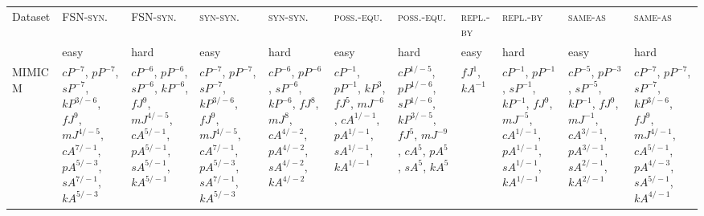 \documentclass[letterpaper]{article} %
\newcommand{\dataset}[1]{\textsc{#1}}
\begin{document}
\begin{sidewaystable*}
    \centering
    \small
    \begin{tabular}{l l l l l l l l l l l }
    \toprule
         Dataset & \dataset{FSN-syn.} & \dataset{FSN-syn.} & \dataset{syn-syn.} & \dataset{syn-syn.}& \dataset{poss.-equ.} & \dataset{poss.-equ.} & \dataset{repl.-by} & \dataset{repl.-by} & \dataset{same-as} & \dataset{same-as} \\
& easy & hard & easy & hard& easy & hard & easy & hard & easy & hard \\ 
         \midrule
\multirow{10}{1.7cm}{MIMIC M} & \multirow{10}{1.7cm}{$cP^{-7}$, $pP^{-7}$, $sP^{-7}$, $kP^{3/-6}$, $fJ^{9}$, $mJ^{4/-5}$, $cA^{7/-1}$, $pA^{5/-3}$, $sA^{7/-1}$, $kA^{5/-3}$} & \multirow{10}{1.7cm}{$cP^{-6}$, $pP^{-6}$, $sP^{-6}$, $kP^{-6}$, $fJ^{9}$, $mJ^{4/-5}$, $cA^{5/-1}$, $pA^{5/-1}$, $sA^{5/-1}$, $kA^{5/-1}$} & \multirow{10}{1.7cm}{$cP^{-7}$, $pP^{-7}$, $sP^{-7}$, $kP^{3/-6}$, $fJ^{9}$, $mJ^{4/-5}$, $cA^{7/-1}$, $pA^{5/-3}$, $sA^{7/-1}$, $kA^{5/-3}$} & \multirow{10}{1.7cm}{$cP^{-6}$, $pP^{-6}$, $sP^{-6}$, $kP^{-6}$, $fJ^{8}$, $mJ^{8}$, $cA^{4/-2}$, $pA^{4/-2}$, $sA^{4/-2}$, $kA^{4/-2}$} & \multirow{10}{1.7cm}{$cP^{-1}$, $pP^{-1}$, $kP^{3}$, $fJ^{5}$, $mJ^{-6}$, $cA^{1/-1}$, $pA^{1/-1}$, $sA^{1/-1}$, $kA^{1/-1}$} & \multirow{10}{1.7cm}{$cP^{1/-5}$, $pP^{1/-6}$, $sP^{1/-6}$, $kP^{3/-5}$, $fJ^{5}$, $mJ^{-9}$, $cA^{5}$, $pA^{5}$, $sA^{5}$, $kA^{5}$} & \multirow{10}{1.7cm}{$fJ^{1}$, $kA^{-1}$} & \multirow{10}{1.7cm}{$cP^{-1}$, $pP^{-1}$, $sP^{-1}$, $kP^{-1}$, $fJ^{9}$, $mJ^{-5}$, $cA^{1/-1}$, $pA^{1/-1}$, $sA^{1/-1}$, $kA^{1/-1}$} & \multirow{10}{1.7cm}{$cP^{-5}$, $pP^{-3}$, $sP^{-5}$, $kP^{-1}$, $fJ^{9}$, $mJ^{-1}$, $cA^{3/-1}$, $pA^{3/-1}$, $sA^{2/-1}$, $kA^{2/-1}$} & \multirow{10}{1.7cm}{$cP^{-7}$, $pP^{-7}$, $sP^{-7}$, $kP^{3/-6}$, $fJ^{9}$, $mJ^{4/-1}$, $cA^{5/-1}$, $pA^{4/-3}$, $sA^{5/-1}$, $kA^{4/-1}$} \\ \\ \\ \\ \\ \\ \\ \\ \\ \\
\midrule

\end{tabular}
\end{sidewaystable*}
\end{document}
